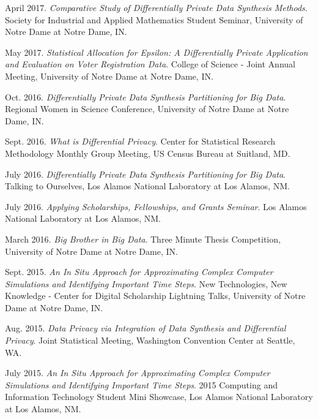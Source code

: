 \documentclass[11pt, letterpaper, roman]{moderncv} %
\begin{document}
\begin{etaremune}[topsep=0pt, itemsep=5pt, partopsep=0pt, parsep=0pt]
   \item April 2017. \textit{Comparative Study of Differentially Private Data Synthesis Methods}. Society for Industrial and Applied Mathematics Student Seminar, University of Notre Dame at Notre Dame, IN.
  
  \item May 2017. \textit{Statistical Allocation for Epsilon: A Differentially Private Application and Evaluation on Voter Registration Data}. College of Science - Joint Annual Meeting, University of Notre Dame at Notre Dame, IN.

  \item Oct. 2016. \textit{Differentially Private Data Synthesis Partitioning for Big Data}. Regional Women in Science Conference, University of Notre Dame at Notre Dame, IN. 

  \item Sept. 2016. \textit{What is Differential Privacy}. Center for Statistical Research Methodology Monthly Group Meeting, US Census Bureau at Suitland, MD. 

  \item July 2016. \textit{Differentially Private Data Synthesis Partitioning for Big Data}. Talking to Ourselves, Los Alamos National Laboratory at Los Alamos, NM.
  
  \item July 2016. \textit{Applying Scholarships, Fellowships, and Grants Seminar}. Los Alamos National Laboratory at Los Alamos, NM.
  
  \item March 2016. \textit{Big Brother in Big Data}. Three Minute Thesis Competition, University of Notre Dame at Notre Dame, IN.

  \item Sept. 2015. \textit{An In Situ Approach for Approximating Complex Computer Simulations and Identifying Important Time Steps}. New Technologies, New Knowledge - Center for Digital Scholarship Lightning Talks, University of Notre Dame at Notre Dame, IN.

  \item Aug. 2015. \textit{Data Privacy via Integration of Data Synthesis and Differential Privacy}. Joint Statistical Meeting, Washington Convention Center at Seattle, WA.

  \item July 2015. \textit{An In Situ Approach for Approximating Complex Computer Simulations and Identifying Important Time Steps}. 2015 Computing and Information Technology Student Mini Showcase, Los Alamos National Laboratory at Los Alamos, NM.


\end{etaremune}
\end{document}
